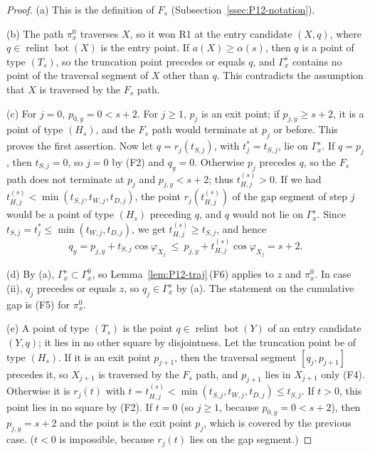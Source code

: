 \documentclass[11pt]{amsart}
\newcommand{\relint}{\operatorname{relint}}
\newcommand{\Bot}{\operatorname{bot}}
\newcommand{\Fs}{F_{s}}
\theoremstyle{definition}
\theoremstyle{remark}
\numberwithin{equation}{section}
\begin{document}
\begin{proof}
(a) This is the definition of $\Fs$ (Subsection~\ref{ssec:P12-notation}).

(b) The path $\pi^0_x$ traverses $X$, so it won R1 at the entry candidate $(X,q)$, where $q\in\relint\Bot(X)$ is the entry point. If $a(X)\ge\alpha(s)$, then $q$ is a point of type $(T_s)$, so the truncation point precedes or equals $q$, and $\Gamma^s_x$ contains no point of the traversal segment of $X$ other than $q$. This contradicts the assumption that $X$ is traversed by the $\Fs$ path.

(c) For $j=0$, $p_{0,y}=0<s+2$. For $j\ge1$, $p_j$ is an exit point; if $p_{j,y}\ge s+2$, it is a point of type $(H_s)$, and the $\Fs$ path would terminate at $p_j$ or before. This proves the first assertion. Now let $q=r_j(t_{S,j})$, with $t^*_j=t_{S,j}$, lie on $\Gamma^s_x$. If $q=p_j$, then $t_{S,j}=0$, so $j=0$ by (F2) and $q_y=0$. Otherwise $p_j$ precedes $q$, so the $\Fs$ path does not terminate at $p_j$ and $p_{j,y}<s+2$; thus $t^{(s)}_{H,j}>0$. If we had $t^{(s)}_{H,j}<\min(t_{S,j},t_{W,j},t_{D,j})$, the point $r_j(t^{(s)}_{H,j})$ of the gap segment of step $j$ would be a point of type $(H_s)$ preceding $q$, and $q$ would not lie on $\Gamma^s_x$. Since $t_{S,j}=t^*_j\le\min(t_{W,j},t_{D,j})$, we get $t^{(s)}_{H,j}\ge t_{S,j}$, and hence
\[
q_y=p_{j,y}+t_{S,j}\cos\varphi_{X_j}\ \le\ p_{j,y}+t^{(s)}_{H,j}\cos\varphi_{X_j}=s+2 .
\]

(d) By (a), $\Gamma^s_x\subset\Gamma^0_x$, so Lemma~\ref{lem:P12-traj}\,(F6) applies to $z$ and $\pi^0_x$. In case (ii), $q_j$ precedes or equals $z$, so $q_j\in\Gamma^s_x$ by (a). The statement on the cumulative gap is (F5) for $\pi^0_x$.

(e) A point of type $(T_s)$ is the point $q\in\relint\Bot(Y)$ of an entry candidate $(Y,q)$; it lies in no other square by disjointness. Let the truncation point be of type $(H_s)$. If it is an exit point $p_{j+1}$, then the traversal segment $[q_j,p_{j+1}]$ precedes it, so $X_{j+1}$ is traversed by the $\Fs$ path, and $p_{j+1}$ lies in $X_{j+1}$ only (F4). Otherwise it is $r_j(t)$ with $t=t^{(s)}_{H,j}<\min(t_{S,j},t_{W,j},t_{D,j})\le t_{S,j}$. If $t>0$, this point lies in no square by (F2). If $t=0$ \textup{(}so $j\ge1$, because $p_{0,y}=0<s+2$\textup{)}, then $p_{j,y}=s+2$ and the point is the exit point $p_j$, which is covered by the previous case. \textup{(}$t<0$ is impossible, because $r_j(t)$ lies on the gap segment.\textup{)}
\end{proof}
\end{document}
